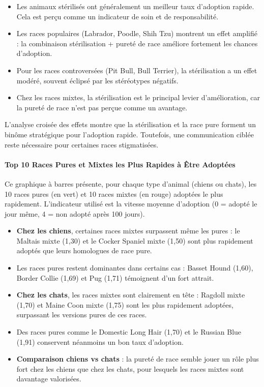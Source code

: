 \documentclass[a4paper,12pt]{article}
\begin{document}
\begin{itemize}
    \item Les animaux stérilisés ont généralement un meilleur taux d’adoption rapide. Cela est perçu comme un indicateur de soin et de responsabilité.
    \item Les races populaires (Labrador, Poodle, Shih Tzu) montrent un effet amplifié : la combinaison stérilisation + pureté de race améliore fortement les chances d’adoption.
    \item Pour les races controversées (Pit Bull, Bull Terrier), la stérilisation a un effet modéré, souvent éclipsé par les stéréotypes négatifs.
    \item Chez les races mixtes, la stérilisation est le principal levier d’amélioration, car la pureté de race n’est pas perçue comme un avantage.
\end{itemize}

L’analyse croisée des effets montre que la stérilisation et la race pure forment un binôme stratégique pour l’adoption rapide. Toutefois, une communication ciblée reste nécessaire pour certaines races stigmatisées.

\paragraph{Top 10 Races Pures et Mixtes les Plus Rapides à Être Adoptées}

Ce graphique à barres présente, pour chaque type d’animal (chiens ou chats), les 10 races pures (en vert) et 10 races mixtes (en rouge) adoptées le plus rapidement. L’indicateur utilisé est la vitesse moyenne d’adoption (0 = adopté le jour même, 4 = non adopté après 100 jours).

\begin{itemize}
    \item \textbf{Chez les chiens}, certaines races mixtes surpassent même les pures : le Maltais mixte (1,30) et le Cocker Spaniel mixte (1,50) sont plus rapidement adoptés que leurs homologues de race pure.
    \item Les races pures restent dominantes dans certains cas : Basset Hound (1,60), Border Collie (1,69) et Pug (1,71) témoignent d’un fort attrait.
    \item \textbf{Chez les chats}, les races mixtes sont clairement en tête : Ragdoll mixte (1,70) et Maine Coon mixte (1,75) sont les plus rapidement adoptées, surpassant les versions pures de ces races.
    \item Des races pures comme le Domestic Long Hair (1,70) et le Russian Blue (1,91) conservent néanmoins un bon taux d’adoption.
    \item \textbf{Comparaison chiens vs chats} : la pureté de race semble jouer un rôle plus fort chez les chiens que chez les chats, pour lesquels les races mixtes sont davantage valorisées.
\end{itemize}
\end{document}
